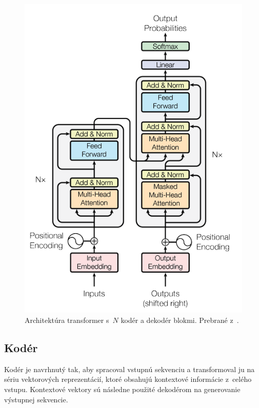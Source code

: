 \begin{figure}[!ht]
    \centering
    \includegraphics{obrazky/Transformer_architecture.png}
    \caption{Architektúra transformer s~$N$ kodér a dekodér blokmi. Prebrané z~\cite{vaswani2023attention}.}
    \label{fig:transformer_architecture}
\end{figure}

\subsection{Kodér}

Kodér je navrhnutý tak, aby spracoval vstupnú sekvenciu a transformoval ju na sériu vektorových reprezentácií, ktoré obsahujú kontextové informácie z~celého vstupu. Kontextové vektory sú následne použité dekodérom na 
generovanie výstupnej sekvencie.

